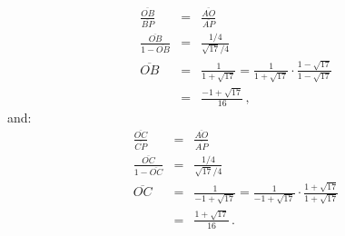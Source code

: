 \documentclass[11pt,a4paper]{article}
\newenvironment{form}[1]{%
\begin{displaymath}%
\renewcommand{\arraystretch}{#1}%
\begin{array}{lcl}}%
{\end{array}%
\end{displaymath}%
}
\newcommand*{\disfrac}[2]{\displaystyle\frac{#1}{#2}}
\begin{document}
\begin{form}{2}
\disfrac{\overline{OB}}{\overline{BP}}&=&\disfrac{\overline{AO}}{\overline{AP}}\\
\disfrac{\overline{OB}}{1-\overline{OB}}&=&\disfrac{1/4}{\sqrt{17}/{4}}\\
\overline{OB}&=&\disfrac{1}{1+\sqrt{17}}=\disfrac{1}{1+\sqrt{17}}\cdot \disfrac{1-\sqrt{17}}{1-\sqrt{17}}\\
&=&\disfrac{-1+\sqrt{17}}{16}\,,
\end{form}
and:
\begin{form}{2}
\disfrac{\overline{OC}}{\overline{CP}}&=&\disfrac{\overline{AO}}{\overline{AP}}\\
\disfrac{\overline{OC}}{1-\overline{OC}}&=&\disfrac{1/4}{\sqrt{17}/{4}}\\
\overline{OC}&=&\disfrac{1}{-1+\sqrt{17}}=\disfrac{1}{-1+\sqrt{17}}\cdot \disfrac{1+\sqrt{17}}{1+\sqrt{17}}\\
&=&\disfrac{1+\sqrt{17}}{16}\,.
\end{form}

\pagebreak[3]
\end{document}
